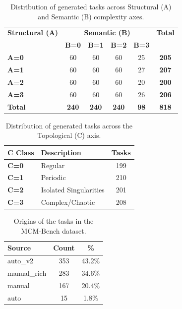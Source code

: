 \begin{table}[h]
\centering
\begin{tabular}{l|cccc|c}
\toprule
\textbf{Structural (A)} & \multicolumn{4}{c|}{\textbf{Semantic (B)}} & \textbf{Total} \\
 & \textbf{B=0} & \textbf{B=1} & \textbf{B=2} & \textbf{B=3} & \\
\midrule
\textbf{A=0} & 60 & 60 & 60 & 25 & \textbf{205} \\
\textbf{A=1} & 60 & 60 & 60 & 27 & \textbf{207} \\
\textbf{A=2} & 60 & 60 & 60 & 20 & \textbf{200} \\
\textbf{A=3} & 60 & 60 & 60 & 26 & \textbf{206} \\
\midrule
\textbf{Total} & \textbf{240} & \textbf{240} & \textbf{240} & \textbf{98} & \textbf{818} \\
\bottomrule
\end{tabular}
\caption{Distribution of generated tasks across Structural (A) and Semantic (B) complexity axes.}
\label{tab:coverage_ab}
\end{table}

\begin{table}[h]
\centering
\begin{tabular}{llc}
\toprule
\textbf{C Class} & \textbf{Description} & \textbf{Tasks} \\
\midrule
\textbf{C=0} & Regular & 199 \\
\textbf{C=1} & Periodic & 210 \\
\textbf{C=2} & Isolated Singularities & 201 \\
\textbf{C=3} & Complex/Chaotic & 208 \\
\bottomrule
\end{tabular}
\caption{Distribution of generated tasks across the Topological (C) axis.}
\label{tab:coverage_c}
\end{table}

\begin{table}[h]
\centering
\begin{tabular}{lcc}
\toprule
\textbf{Source} & \textbf{Count} & \textbf{\%} \\
\midrule
auto\_v2 & 353 & 43.2\% \\
manual\_rich & 283 & 34.6\% \\
manual & 167 & 20.4\% \\
auto & 15 & 1.8\% \\
\bottomrule
\end{tabular}
\caption{Origins of the tasks in the MCM-Bench dataset.}
\label{tab:task_sources}
\end{table}

